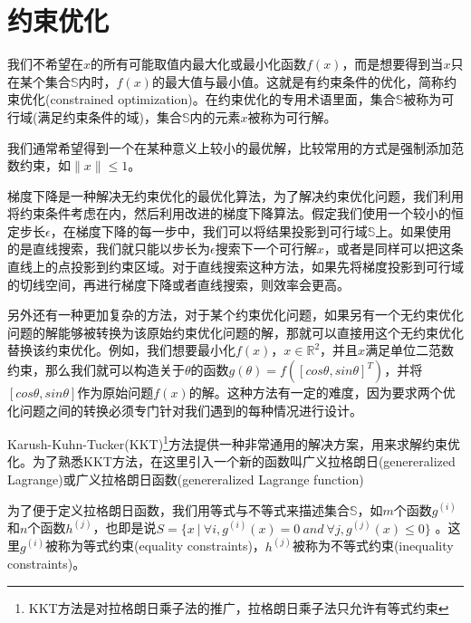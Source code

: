 


\section{约束优化}
\label{sec:4.4}

我们不希望在$x$的所有可能取值内最大化或最小化函数$f(x)$，而是想要得到当$x$只在某个集合$\mathbb{S}$内时，$f(x)$的最大值与最小值。这就是有约束条件的优化，简称约束优化(constrained optimization)。在约束优化的专用术语里面，集合$\mathbb{S}$被称为可行域(满足约束条件的域)，集合$\mathbb{S}$内的元素$x$被称为可行解。

我们通常希望得到一个在某种意义上较小的最优解，比较常用的方式是强制添加范数约束，如$\parallel{x}\parallel\leq1$。

梯度下降是一种解决无约束优化的最优化算法，为了解决约束优化问题，我们利用将约束条件考虑在内，然后利用改进的梯度下降算法。假定我们使用一个较小的恒定步长$\epsilon$，在梯度下降的每一步中，我们可以将结果投影到可行域$\mathbb{S}$上。如果使用的是直线搜索，我们就只能以步长为$\epsilon$搜索下一个可行解$x$，或者是同样可以把这条直线上的点投影到约束区域。对于直线搜索这种方法，如果先将梯度投影到可行域的切线空间，再进行梯度下降或者直线搜索，则效率会更高。

另外还有一种更加复杂的方法，对于某个约束优化问题，如果另有一个无约束优化问题的解能够被转换为该原始约束优化问题的解，那就可以直接用这个无约束优化替换该约束优化。例如，我们想要最小化$f(x)$，$x\in \mathbb{R} ^2$，并且$x$满足单位二范数约束，那么我们就可以构造关于$\theta$的函数$g(\theta)=f([cos\theta,sin\theta]^T)$，并将$[cos\theta,sin\theta]$作为原始问题$f(x)$的解。这种方法有一定的难度，因为要求两个优化问题之间的转换必须专门针对我们遇到的每种情况进行设计。

Karush-Kuhn-Tucker(KKT)\footnote{KKT方法是对拉格朗日乘子法的推广，拉格朗日乘子法只允许有等式约束}方法提供一种非常通用的解决方案，用来求解约束优化。为了熟悉KKT方法，在这里引入一个新的函数叫广义拉格朗日(genereralized Lagrange)或广义拉格朗日函数(genereralized Lagrange function)

为了便于定义拉格朗日函数，我们用等式与不等式来描述集合$\mathbb{S}$，如$m$个函数$g^{(i)}$和$n$个函数$h^{(j)}$，也即是说$S=\{x \ | \ \forall i,g^{(i)}(x)=0 \ and \ \forall j,g^{(j)}(x)\le0\}$
。这里$g^{(i)}$被称为等式约束(equality constraints)，$h^{(j)}$被称为不等式约束(inequality constraints)。


